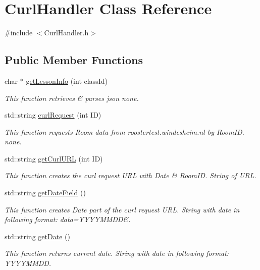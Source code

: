 \hypertarget{classCurlHandler}{}\section{Curl\+Handler Class Reference}
\label{classCurlHandler}


{\ttfamily \#include $<$Curl\+Handler.\+h$>$}

\subsection*{Public Member Functions}
\begin{DoxyCompactItemize}
\item 
char $\ast$ \hyperlink{classCurlHandler_a8f82086fdc6993eb9068a25632652fb0}{get\+Lesson\+Info} (int class\+Id)
\begin{DoxyCompactList}\small\item\em This function retrieves \& parses json  none. \end{DoxyCompactList}\item 
std\+::string \hyperlink{classCurlHandler_a3b115e8ef11a96743b49797b4025b3a0}{curl\+Request} (int ID)
\begin{DoxyCompactList}\small\item\em This function requests Room data from roostertest.\+windesheim.\+nl by Room\+ID.  none. \end{DoxyCompactList}\item 
std\+::string \hyperlink{classCurlHandler_a967784524e6d6d95b1d7089e3221fbfb}{get\+Curl\+U\+RL} (int ID)
\begin{DoxyCompactList}\small\item\em This function creates the curl request U\+RL with Date \& Room\+ID.  String of U\+RL. \end{DoxyCompactList}\item 
std\+::string \hyperlink{classCurlHandler_a021967e447f8980a4629b85cc3683a93}{get\+Date\+Field} ()
\begin{DoxyCompactList}\small\item\em This function creates Date part of the curl request U\+RL.  String with date in following format\+: data=Y\+Y\+Y\+Y\+M\+M\+DD\&. \end{DoxyCompactList}\item 
std\+::string \hyperlink{classCurlHandler_af36e06319f16a97938bfb9a2ee8c0fa6}{get\+Date} ()
\begin{DoxyCompactList}\small\item\em This function returns current date.  String with date in following format\+: Y\+Y\+Y\+Y\+M\+M\+DD. \end{DoxyCompactList}\item 

\end{DoxyCompactItemize}
